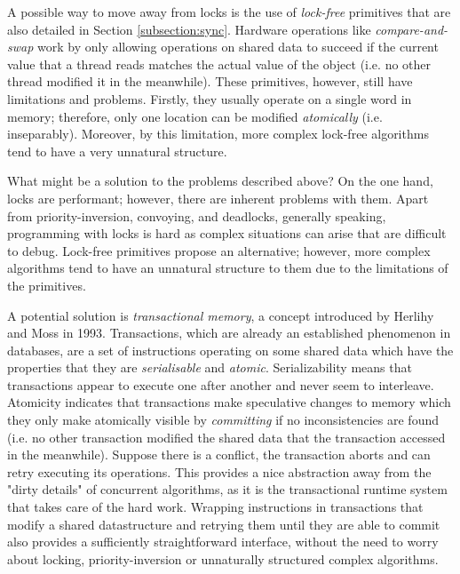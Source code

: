 A possible way to move away from locks is the use of \textit{lock-free} primitives that are also detailed in Section \ref{subsection:sync}. Hardware operations like \textit{compare-and-swap} work by only allowing operations on shared data to succeed if the current value that a thread reads matches the actual value of the object (i.e. no other thread modified it in the meanwhile). These primitives, however, still have limitations and problems. Firstly, they usually operate on a single word in memory; therefore, only one location can be modified \textit{atomically} (i.e. inseparably). Moreover, by this limitation, more complex lock-free algorithms tend to have a very unnatural structure.

What might be a solution to the problems described above? On the one hand, locks are performant; however, there are inherent problems with them. Apart from priority-inversion, convoying, and deadlocks, generally speaking, programming with locks is hard as complex situations can arise that are difficult to debug. Lock-free primitives propose an alternative; however, more complex algorithms tend to have an unnatural structure to them due to the limitations of the primitives.

A potential solution is \textit{transactional memory}, a concept introduced by Herlihy and Moss in 1993\cite{herlihy-moss}. Transactions, which are already an established phenomenon in databases, are a set of instructions operating on some shared data which have the properties that they are \textit{serialisable} and \textit{atomic}. Serializability means that transactions appear to execute one after another and never seem to interleave. Atomicity indicates that transactions make speculative changes to memory which they only make atomically visible by \textit{committing} if no inconsistencies are found (i.e. no other transaction modified the shared data that the transaction accessed in the meanwhile). Suppose there is a conflict, the transaction aborts and can retry executing its operations. This provides a nice abstraction away from the "dirty details" of concurrent algorithms, as it is the transactional runtime system that takes care of the hard work. Wrapping instructions in transactions that modify a shared datastructure and retrying them until they are able to commit also provides a sufficiently straightforward interface, without the need to worry about locking, priority-inversion or unnaturally structured complex algorithms.

